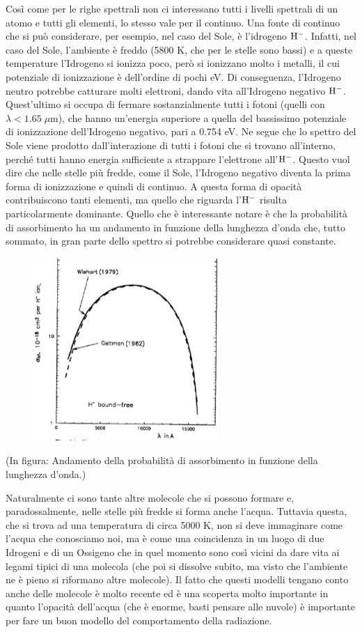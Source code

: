 Così come per le righe spettrali non ci interessano tutti i livelli spettrali di un atomo e tutti gli elementi, lo stesso vale per il continuo. Una fonte di continuo che si può considerare, per esempio, nel caso del Sole, è l'idrogeno $\rm H^-$. Infatti, nel caso del Sole, l'ambiente è freddo (5800 K, che per le stelle sono bassi) e a queste temperature l'Idrogeno si ionizza poco, però si ionizzano molto i metalli, il cui potenziale di ionizzazione è dell'ordine di pochi eV. Di conseguenza, l'Idrogeno neutro potrebbe catturare molti elettroni, dando vita all'Idrogeno negativo $\rm H^-$. Quest'ultimo si occupa di fermare sostanzialmente tutti i fotoni (quelli con $\lambda < 1.65 \; \mu$m), che hanno un'energia superiore a quella del bassissimo potenziale di ionizzazione dell'Idrogeno negativo, pari a 0.754 eV. Ne segue che lo spettro del Sole viene prodotto dall'interazione di tutti i fotoni che si trovano all'interno, perché tutti hanno energia sufficiente a strappare l'elettrone all'$\rm H^-$. Questo vuol dire che nelle stelle più fredde, come il Sole, l'Idrogeno negativo diventa la prima forma di ionizzazione e quindi di continuo. A questa forma di opacità contribuiscono tanti elementi, ma quello che riguarda l'$\rm H^-$ risulta particolarmente dominante. Quello che è interessante notare è che la probabilità di assorbimento ha un andamento in funzione della lunghezza d'onda che, tutto sommato, in gran parte dello spettro si potrebbe considerare quasi constante.

\begin{figure}[H]
  \centering
  \includegraphics[width=7cm]{Hcontinuo.jpg}
  \label{fig:Hcontinuo}
\end{figure}

(In figura: Andamento della probabilità di assorbimento in funzione della lunghezza d'onda.)

Naturalmente ci sono tante altre molecole che si possono formare e, paradossalmente, nelle stelle più fredde si forma anche l'acqua. Tuttavia questa, che si trova ad una temperatura di circa 5000 K, non si deve immaginare come l'acqua che conosciamo noi, ma è come una coincidenza in un luogo di due Idrogeni e di un Ossigeno che in quel momento sono così vicini da dare vita ai legami tipici di una molecola (che poi si dissolve subito, ma visto che l'ambiente ne è pieno si riformano altre molecole). Il fatto che questi modelli tengano conto anche delle molecole è molto recente ed è una scoperta molto importante in quanto l'opacità dell'acqua (che è enorme, basti pensare alle nuvole) è importante per fare un buon modello del comportamento della radiazione.

